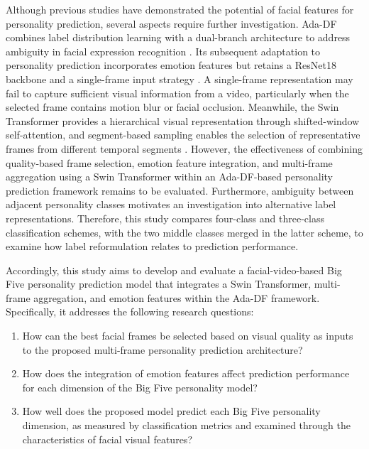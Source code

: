 \documentclass[10pt,a4paper,twocolumn]{article}
\begin{document}
Although previous studies have demonstrated the potential of facial features for personality prediction, several aspects require further investigation. Ada-DF combines label distribution learning with a dual-branch architecture to address ambiguity in facial expression recognition \cite{liu_adadf}. Its subsequent adaptation to personality prediction incorporates emotion features but retains a ResNet18 backbone and a single-frame input strategy \cite{wardana}. A single-frame representation may fail to capture sufficient visual information from a video, particularly when the selected frame contains motion blur or facial occlusion. Meanwhile, the Swin Transformer provides a hierarchical visual representation through shifted-window self-attention, and segment-based sampling enables the selection of representative frames from different temporal segments \cite{swin,tsn}. However, the effectiveness of combining quality-based frame selection, emotion feature integration, and multi-frame aggregation using a Swin Transformer within an Ada-DF-based personality prediction framework remains to be evaluated. Furthermore, ambiguity between adjacent personality classes motivates an investigation into alternative label representations. Therefore, this study compares four-class and three-class classification schemes, with the two middle classes merged in the latter scheme, to examine how label reformulation relates to prediction performance.

Accordingly, this study aims to develop and evaluate a facial-video-based Big Five personality prediction model that integrates a Swin Transformer, multi-frame aggregation, and emotion features within the Ada-DF framework. Specifically, it addresses the following research questions:

\begin{enumerate}
    \item[\textbf{RQ1}] How can the best facial frames be selected based on visual quality as inputs to the proposed multi-frame personality prediction architecture?
    
    \item[\textbf{RQ2}] How does the integration of emotion features affect prediction performance for each dimension of the Big Five personality model?
    
    \item[\textbf{RQ3}] How well does the proposed model predict each Big Five personality dimension, as measured by classification metrics and examined through the characteristics of facial visual features?
\end{enumerate}
\end{document}

